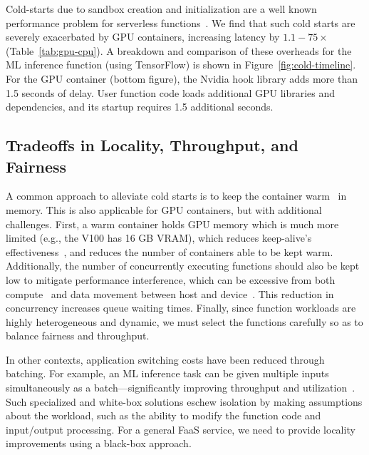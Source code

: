 Cold-starts due to sandbox creation and initialization are a well known performance problem for serverless functions~\cite{du2020catalyzer,lin_mitigating_2019,manner_cold_2018,mohan_agile_2019}.
We find that such cold starts are severely exacerbated by GPU containers, increasing latency by $1.1-75\times$ (Table~\ref{tab:gpu-cpu}).
A breakdown and comparison of these overheads for the ML inference function (using TensorFlow) is shown in Figure~\ref{fig:cold-timeline}.
For the GPU container (bottom figure), the Nvidia hook library adds more than 1.5 seconds of delay.
User function code loads additional GPU libraries and dependencies, and its startup requires 1.5 additional seconds.

\subsection{Tradeoffs in Locality, Throughput, and Fairness}

A common approach to alleviate cold starts is to keep the container warm~\cite{faascache-asplos21} in memory.
This is also applicable for GPU containers, but with additional challenges.
First, a warm container holds GPU memory which is much more limited (e.g., the V100 has 16 GB VRAM), which reduces keep-alive's effectiveness~\cite{faascache-asplos21}, and reduces the number of containers able to be kept warm.
Additionally, the number of concurrently executing functions should also be kept low to mitigate performance interference, which can be excessive from both compute~\cite{yamagiwa2009performance,phull2012interference} and data movement between host and device~\cite{yu2019automatic, hong2017gpu}.
This reduction in concurrency increases queue waiting times.
Finally, since function workloads are highly heterogeneous and dynamic, we must select the  functions carefully so as to balance fairness and throughput.


In other contexts, application switching costs have been reduced through batching.
For example, an ML inference task can be given multiple inputs simultaneously as a batch---significantly improving throughput and utilization~\cite{ali_batch_2020,yang2022infless,ali2022optimizing}.
Such specialized and white-box solutions eschew isolation by making assumptions about the workload, such as the ability to modify the function code and input/output processing. 
For a general FaaS service, we need to provide locality improvements using a black-box approach.


